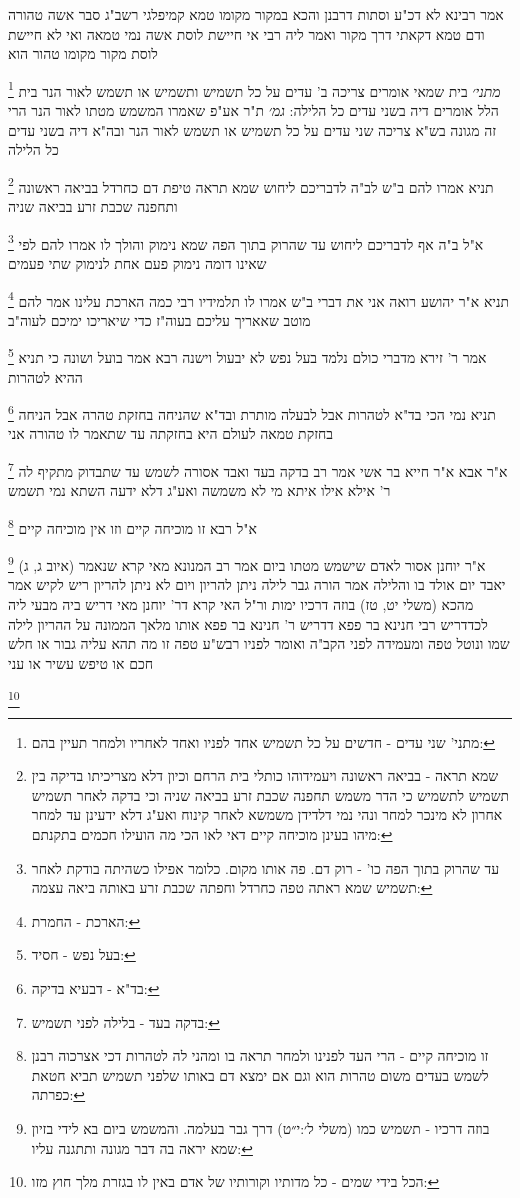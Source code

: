 \documentclass[12pt, openany]{book}
\newcommand{\footnotecomment}[1]{
	\renewcommand\thefootnote{}
	\footnote{#1}}
\newcommand{\commenta}[1]{\footnotecomment{#1}}
\begin{document}
{אמר רבינא לא דכ"ע וסתות דרבנן והכא במקור מקומו טמא קמיפלגי 
רשב"ג סבר אשה טהורה ודם טמא דקאתי דרך מקור 
ואמר ליה רבי אי חיישת לוסת אשה נמי טמאה ואי לא חיישת לוסת מקור מקומו טהור הוא
\commenta{מתני' שני עדים - חדשים על כל תשמיש אחד לפניו ואחד לאחריו ולמחר תעיין בהם:}
{\large\emph{מתני׳}} בית שמאי אומרים צריכה ב' עדים על כל תשמיש ותשמיש או תשמש לאור הנר בית הלל אומרים דיה בשני עדים כל הלילה:
{\large\emph{גמ׳}} ת"ר אע"פ שאמרו המשמש מטתו לאור הנר הרי זה מגונה בש"א צריכה שני עדים על כל תשמיש או תשמש לאור הנר ובה"א דיה בשני עדים כל הלילה 
\commenta{שמא תראה - בביאה ראשונה ויעמידוהו כותלי בית הרחם וכיון דלא מצריכיתו בדיקה בין תשמיש לתשמיש כי הדר משמש תחפנה שכבת זרע בביאה שניה וכי בדקה לאחר תשמיש אחרון לא מינכר למחר ונהי נמי דלדידן משמשא לאחר קינוח ואע"ג דלא ידעינן עד למחר מיהו בעינן מוכיחה קיים דאי לאו הכי מה הועילו חכמים בתקנתם:}
תניא אמרו להם ב"ש לב"ה לדבריכם ליחוש שמא תראה טיפת דם כחרדל בביאה ראשונה ותחפנה שכבת זרע בביאה שניה 
\commenta{עד שהרוק בתוך הפה כו' - רוק דם. פה אותו מקום. כלומר אפילו כשהיתה בודקת לאחר תשמיש שמא ראתה טפה כחרדל וחפתה שכבת זרע באותה ביאה עצמה:}
א"ל ב"ה אף לדבריכם ליחוש עד שהרוק בתוך הפה שמא נימוק והולך לו 
אמרו להם לפי שאינו דומה נימוק פעם אחת לנימוק שתי פעמים 
\commenta{הארכת - החמרת:}
תניא א"ר יהושע רואה אני את דברי ב"ש אמרו לו תלמידיו רבי כמה הארכת עלינו אמר להם מוטב שאאריך עליכם בעוה"ז כדי שיאריכו ימיכם לעוה"ב 
\commenta{בעל נפש - חסיד:}
אמר ר' זירא מדברי כולם נלמד בעל נפש לא יבעול וישנה 
רבא אמר בועל ושונה כי תניא ההיא לטהרות 
\commenta{בד"א - דבעיא בדיקה:}
תניא נמי הכי בד"א לטהרות אבל לבעלה מותרת ובד"א שהניחה בחזקת טהרה אבל הניחה בחזקת טמאה לעולם היא בחזקתה עד שתאמר לו טהורה אני 
\commenta{בדקה בעד - בלילה לפני תשמיש:}
א"ר אבא א"ר חייא בר אשי אמר רב בדקה בעד ואבד אסורה לשמש עד שתבדוק מתקיף לה ר' אילא אילו איתא מי לא משמשה ואע"ג דלא ידעה השתא נמי תשמש 
\commenta{זו מוכיחה קיים - הרי העד לפנינו ולמחר תראה בו ומהני לה לטהרות דכי אצרכוה רבנן לשמש בעדים משום טהרות הוא וגם אם ימצא דם באותו שלפני תשמיש תביא חטאת כפרתה:}
א"ל רבא זו מוכיחה קיים וזו אין מוכיחה קיים
\commenta{בוזה דרכיו - תשמיש כמו (משלי ל׳:י״ט) דרך גבר בעלמה. והמשמש ביום בא לידי בזיון שמא יראה בה דבר מגונה ותתגנה עליו:}
א"ר יוחנן  אסור לאדם שישמש מטתו ביום אמר רב המנונא מאי קרא שנאמר (איוב ג, ג) יאבד יום אולד בו והלילה אמר הורה גבר לילה ניתן להריון ויום לא ניתן להריון ריש לקיש אמר מהכא (משלי יט, טז) בוזה דרכיו ימות 
ור"ל האי קרא דר' יוחנן מאי דריש ביה מבעי ליה לכדדריש רבי חנינא בר פפא דדריש ר' חנינא בר פפא אותו מלאך הממונה על ההריון לילה שמו ונוטל טפה ומעמידה לפני הקב"ה ואומר לפניו רבש"ע טפה זו מה תהא עליה גבור או חלש חכם או טיפש עשיר או עני 
\commenta{הכל בידי שמים - כל מדותיו וקורותיו של אדם באין לו בגזרת מלך חוץ מזו:}
}
\end{document}
